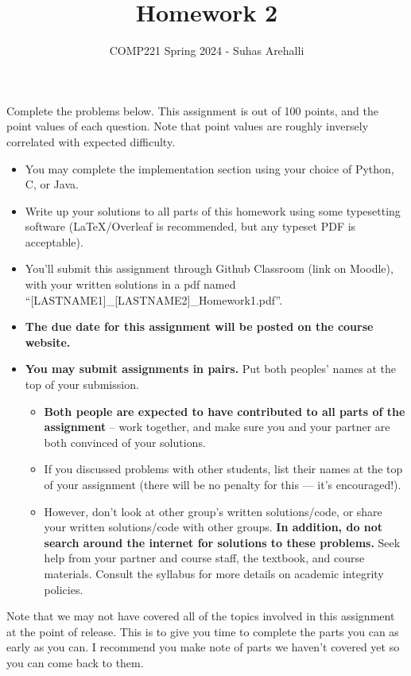 \documentclass{exam}
\title{Homework 2}
\author{COMP221 Spring 2024 - Suhas Arehalli}
\date{}
\begin{document}
\maketitle

Complete the problems below. This assignment is out of 100 points, and the point values of each question. Note that point values are roughly inversely correlated with expected difficulty.

\begin{itemize}
    \item You may complete the implementation section using your choice of Python, C, or Java.
    \item Write up your solutions to all parts of this homework using some typesetting software (LaTeX/Overleaf is recommended, but any typeset PDF is acceptable).
    \item You'll submit this assignment through Github Classroom (link on Moodle), with your written solutions in a pdf named ``[LASTNAME1]\_[LASTNAME2]\_Homework1.pdf''.
    \item \textbf{The due date for this assignment will be posted on the course website.}
    \item \textbf{You may submit assignments in pairs.} Put both peoples' names at the top of your submission. \begin{itemize}
        \item \textbf{Both people are expected to have contributed to all parts of the assignment} -- work together, and make sure you and your partner are both convinced of your solutions.
        \item If you discussed problems with other students, list their names at the top of your assignment (there will be no penalty for this --- it's encouraged!).
        \item However, don't look at other group's written solutions/code, or share your written solutions/code with other groups. \textbf{In addition, do not search around the internet for solutions to these problems.} Seek help from your partner and course staff, the textbook, and course materials. Consult the syllabus for more details on academic integrity policies.
    \end{itemize}  
\end{itemize}   

Note that we may not have covered all of the topics involved in this assignment at the point of release. This is to give you time to complete the parts you can as early as you can. I recommend you make note of parts we haven't covered yet so you can come back to them.
\end{document}
